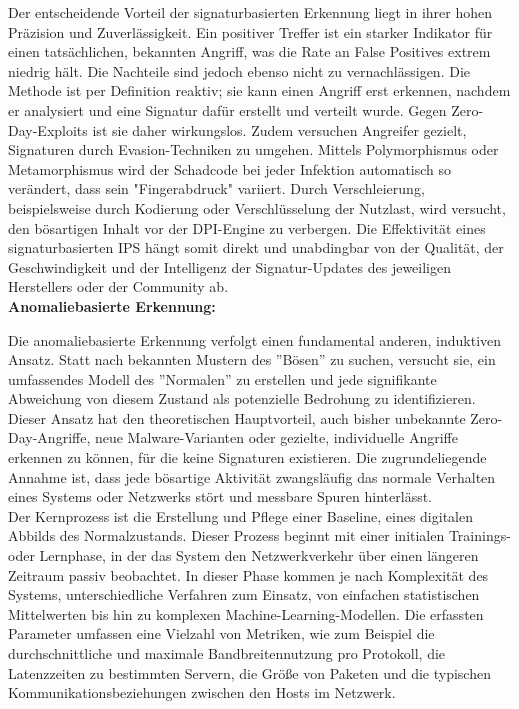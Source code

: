 Der entscheidende Vorteil der signaturbasierten Erkennung liegt in ihrer hohen Präzision und Zuverlässigkeit. Ein positiver Treffer ist ein starker Indikator für einen tatsächlichen, bekannten Angriff, was die Rate an False Positives extrem niedrig hält. Die Nachteile sind jedoch ebenso nicht zu vernachlässigen. Die Methode ist per Definition reaktiv; sie kann einen Angriff erst erkennen, nachdem er analysiert und eine Signatur dafür erstellt und verteilt wurde. Gegen Zero-Day-Exploits ist sie daher wirkungslos. Zudem versuchen Angreifer gezielt, Signaturen durch Evasion-Techniken zu umgehen. Mittels Polymorphismus oder Metamorphismus wird der Schadcode bei jeder Infektion automatisch so verändert, dass sein "Fingerabdruck" variiert. Durch Verschleierung, beispielsweise durch Kodierung oder Verschlüsselung der Nutzlast, wird versucht, den bösartigen Inhalt vor der DPI-Engine zu verbergen. Die Effektivität eines signaturbasierten IPS hängt somit direkt und unabdingbar von der Qualität, der Geschwindigkeit und der Intelligenz der Signatur-Updates des jeweiligen Herstellers oder der Community ab.\\

\textbf{Anomaliebasierte Erkennung:}

Die anomaliebasierte Erkennung verfolgt einen fundamental anderen, induktiven Ansatz. Statt nach bekannten Mustern des ''Bösen'' zu suchen, versucht sie, ein umfassendes Modell des ''Normalen'' zu erstellen und jede signifikante Abweichung von diesem Zustand als potenzielle Bedrohung zu identifizieren. Dieser Ansatz hat den theoretischen Hauptvorteil, auch bisher unbekannte Zero-Day-Angriffe, neue Malware-Varianten oder gezielte, individuelle Angriffe erkennen zu können, für die keine Signaturen existieren. Die zugrundeliegende Annahme ist, dass jede bösartige Aktivität zwangsläufig das normale Verhalten eines Systems oder Netzwerks stört und messbare Spuren hinterlässt.\\

Der Kernprozess ist die Erstellung und Pflege einer Baseline, eines digitalen Abbilds des Normalzustands. Dieser Prozess beginnt mit einer initialen Trainings- oder Lernphase, in der das System den Netzwerkverkehr über einen längeren Zeitraum passiv beobachtet. In dieser Phase kommen je nach Komplexität des Systems, unterschiedliche Verfahren zum Einsatz, von einfachen statistischen Mittelwerten bis hin zu komplexen Machine-Learning-Modellen. Die erfassten Parameter umfassen eine Vielzahl von Metriken, wie zum Beispiel die durchschnittliche und maximale Bandbreitennutzung pro Protokoll, die Latenzzeiten zu bestimmten Servern, die Größe von Paketen und die typischen Kommunikationsbeziehungen zwischen den Hosts im Netzwerk.\\

